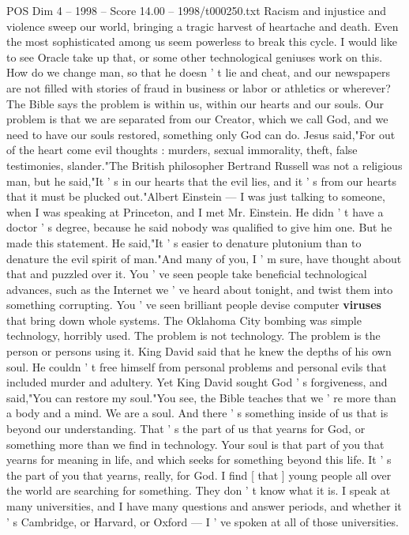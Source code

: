 \begin{textsample}{POS Dim 4 – 1998 – Score 14.00 – 1998/t000250.txt}
Racism and injustice and violence sweep our world, bringing a tragic harvest of heartache and death.
Even the most sophisticated among us seem powerless to break this cycle.
I would like to see Oracle take up that, or some other technological geniuses work on this.
How do we change man, so that he doesn ' t lie and cheat, and our newspapers are not filled with stories of fraud in business or labor or athletics or wherever?
The Bible says the problem is within us, within our hearts and our souls.
Our problem is that we are separated from our Creator, which we call God, and we need to have our souls restored, something only God can do.
Jesus said,"For out of the heart come evil thoughts : murders, sexual immorality, theft, false testimonies, slander."The British philosopher Bertrand Russell was not a religious man, but he said,"It ' s in our hearts that the evil lies, and it ' s from our hearts that it must be plucked out."Albert Einstein — I was just talking to someone, when I was speaking at Princeton, and I met Mr.
Einstein.
He didn ' t have a doctor ' s degree, because he said nobody was qualified to give him one.
But he made this statement.
He said,"It ' s easier to denature plutonium than to denature the evil spirit of man."And many of you, I ' m sure, have thought about that and puzzled over it.
You ' ve seen people take beneficial technological advances, such as the Internet we ' ve heard about tonight, and twist them into something corrupting.
You ' ve seen brilliant people devise computer \textbf{viruses} that bring down whole systems.
The Oklahoma City bombing was simple technology, horribly used.
The problem is not technology.
The problem is the person or persons using it.
King David said that he knew the depths of his own soul.
He couldn ' t free himself from personal problems and personal evils that included murder and adultery.
Yet King David sought God ' s forgiveness, and said,"You can restore my soul."You see, the Bible teaches that we ' re more than a body and a mind.
We are a soul.
And there ' s something inside of us that is beyond our understanding.
That ' s the part of us that yearns for God, or something more than we find in technology.
Your soul is that part of you that yearns for meaning in life, and which seeks for something beyond this life.
It ' s the part of you that yearns, really, for God.
I find [ that ] young people all over the world are searching for something.
They don ' t know what it is.
I speak at many universities, and I have many questions and answer periods, and whether it ' s Cambridge, or Harvard, or Oxford — I ' ve spoken at all of those universities.

\end{textsample}
